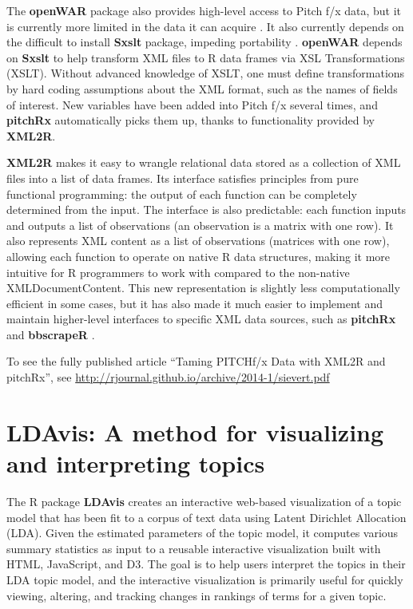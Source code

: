 \documentclass[11pt]{isuthesis}
\begin{document}
The \textbf{openWAR} package also provides high-level access to Pitch
f/x data, but it is currently more limited in the data it can acquire
\citep{openWAR}. It also currently depends on the difficult to install
\textbf{Sxslt} package, impeding portability \citep{Sxslt}.
\textbf{openWAR} depends on \textbf{Sxslt} to help transform XML files
to R data frames via XSL Transformations (XSLT). Without advanced
knowledge of XSLT, one must define transformations by hard coding
assumptions about the XML format, such as the names of fields of
interest. New variables have been added into Pitch f/x several times,
and \textbf{pitchRx} automatically picks them up, thanks to
functionality provided by \textbf{XML2R}.

\textbf{XML2R} makes it easy to wrangle relational data stored as a
collection of XML files into a list of data frames. Its interface
satisfies principles from pure functional programming: the output of
each function can be completely determined from the input. The interface
is also predictable: each function inputs and outputs a list of
observations (an observation is a matrix with one row). It also
represents XML content as a list of observations (matrices with one
row), allowing each function to operate on native R data structures,
making it more intuitive for R programmers to work with compared to the
non-native XMLDocumentContent. This new representation is slightly less
computationally efficient in some cases, but it has also made it much
easier to implement and maintain higher-level interfaces to specific XML
data sources, such as \textbf{pitchRx} and \textbf{bbscrapeR}
\citep{bbscrapeR}.

To see the fully published article ``Taming PITCHf/x Data with XML2R and
pitchRx'', see
\url{http://rjournal.github.io/archive/2014-1/sievert.pdf}

\hypertarget{ldavis-a-method-for-visualizing-and-interpreting-topics}{\chapter{LDAvis:
A method for visualizing and interpreting
topics}\label{ldavis-a-method-for-visualizing-and-interpreting-topics}}

The R package \textbf{LDAvis} creates an interactive web-based
visualization of a topic model that has been fit to a corpus of text
data using Latent Dirichlet Allocation (LDA). Given the estimated
parameters of the topic model, it computes various summary statistics as
input to a reusable interactive visualization built with HTML,
JavaScript, and D3. The goal is to help users interpret the topics in
their LDA topic model, and the interactive visualization is primarily
useful for quickly viewing, altering, and tracking changes in rankings
of terms for a given topic.
\end{document}
